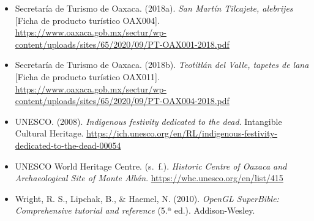\documentclass[11pt,a4paper]{article}
\begin{document}
\begin{itemize}[label={}, leftmargin=1.27cm, itemindent=-1.27cm]
  \item Secretaría de Turismo de Oaxaca. (2018a). \textit{San Martín Tilcajete, alebrijes} [Ficha de producto turístico OAX004]. \url{https://www.oaxaca.gob.mx/sectur/wp-content/uploads/sites/65/2020/09/PT-OAX001-2018.pdf}
  \item Secretaría de Turismo de Oaxaca. (2018b). \textit{Teotitlán del Valle, tapetes de lana} [Ficha de producto turístico OAX011]. \url{https://www.oaxaca.gob.mx/sectur/wp-content/uploads/sites/65/2020/09/PT-OAX004-2018.pdf}
  \item UNESCO. (2008). \textit{Indigenous festivity dedicated to the dead}. Intangible Cultural Heritage. \url{https://ich.unesco.org/en/RL/indigenous-festivity-dedicated-to-the-dead-00054}
  \item UNESCO World Heritage Centre. (s.~f.). \textit{Historic Centre of Oaxaca and Archaeological Site of Monte Albán}. \url{https://whc.unesco.org/en/list/415}
  \item Wright, R. S., Lipchak, B., \& Haemel, N. (2010). \textit{OpenGL SuperBible: Comprehensive tutorial and reference} (5.ª ed.). Addison-Wesley.
\end{itemize}
\end{document}

